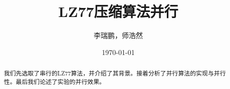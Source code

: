 \documentclass[letterpaper,12pt]{article}
\begin{document}
\title{LZ77压缩算法并行}
\author{李瑞鹏，师浩然}
\date{\today}
\maketitle
\begin{abstract}	
我们先选取了串行的LZ77算法，并介绍了其背景。接着分析了并行算法的实现与并行性。最后我们论述了实验的并行效果。
\end{abstract}
\end{document}
